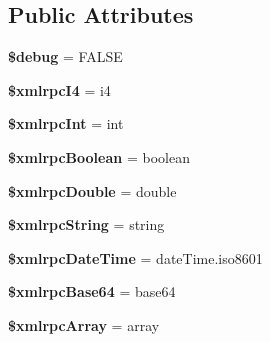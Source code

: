 \subsection*{Public Attributes}
\begin{DoxyCompactItemize}
\item 
\mbox{\label{class_c_i___xmlrpc_a7dc042ba934baa60ea6ad59468a675da}} 
{\bfseries \$debug} = F\+A\+L\+SE
\item 
\mbox{\label{class_c_i___xmlrpc_a6e57d98f61b3e4e5b2f6a66177c51dca}} 
{\bfseries \$xmlrpc\+I4} = \textquotesingle{}i4\textquotesingle{}
\item 
\mbox{\label{class_c_i___xmlrpc_aacd9528c63a2e005d8c938ea9ec982c0}} 
{\bfseries \$xmlrpc\+Int} = \textquotesingle{}int\textquotesingle{}
\item 
\mbox{\label{class_c_i___xmlrpc_af2fe7f7b5030c9a9724493ad84e25d09}} 
{\bfseries \$xmlrpc\+Boolean} = \textquotesingle{}boolean\textquotesingle{}
\item 
\mbox{\label{class_c_i___xmlrpc_a36b85a27312ee0960e363099e2d7f0bf}} 
{\bfseries \$xmlrpc\+Double} = \textquotesingle{}double\textquotesingle{}
\item 
\mbox{\label{class_c_i___xmlrpc_a4ac022bd9b00009ab79686d976ff4818}} 
{\bfseries \$xmlrpc\+String} = \textquotesingle{}string\textquotesingle{}
\item 
\mbox{\label{class_c_i___xmlrpc_afdd29d88f0ec482a54d74c0159cfdbe8}} 
{\bfseries \$xmlrpc\+Date\+Time} = \textquotesingle{}date\+Time.\+iso8601\textquotesingle{}
\item 
\mbox{\label{class_c_i___xmlrpc_acc16480dd4b35e79693a2f86b50916ed}} 
{\bfseries \$xmlrpc\+Base64} = \textquotesingle{}base64\textquotesingle{}
\item 
\mbox{\label{class_c_i___xmlrpc_ac7d807c8193f5ba37bee0bf63136f2e9}} 
{\bfseries \$xmlrpc\+Array} = \textquotesingle{}array\textquotesingle{}
\item 
\mbox{\label{class_c_i___xmlrpc_a2c6c3f53a1d776c06311036ec3b136ea}} 

\end{DoxyCompactItemize}
